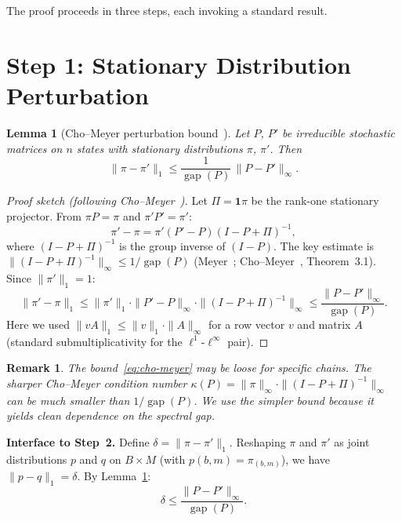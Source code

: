 \documentclass[11pt,a4paper]{article}
\newtheorem{lemma}[theorem]{Lemma}
\newtheorem{remark}[theorem]{Remark}
\DeclareMathOperator{\gap}{gap}
\begin{document}
The proof proceeds in three steps, each invoking a standard result.


\section{Step 1: Stationary Distribution Perturbation}\label{sec:step1}

\begin{lemma}[Cho--Meyer perturbation bound~\cite{ChoMeyer2001}]
\label{lem:cho-meyer}
Let $P$, $P'$ be irreducible stochastic matrices on $n$ states with
stationary distributions $\pi$, $\pi'$.  Then
\begin{equation}\label{eq:cho-meyer}
  \|\pi - \pi'\|_1 \le
  \frac{1}{\gap(P)}\,\|P - P'\|_\infty.
\end{equation}
\end{lemma}

\begin{proof}[Proof sketch (following Cho--Meyer~\cite{ChoMeyer2001})]
Let $\Pi = \mathbf{1}\pi$ be the rank-one stationary projector.
From $\pi P = \pi$ and $\pi' P' = \pi'$:
\[
  \pi' - \pi = \pi'(P' - P)(I - P + \Pi)^{-1},
\]
where $(I - P + \Pi)^{-1}$ is the group inverse of $(I - P)$.
The key estimate is $\|(I - P + \Pi)^{-1}\|_\infty \le 1/\gap(P)$
(Meyer~\cite{Meyer1975}; Cho--Meyer~\cite{ChoMeyer2001}, Theorem~3.1).
Since $\|\pi'\|_1 = 1$:
\[
  \|\pi' - \pi\|_1
  \le \|\pi'\|_1 \cdot \|P' - P\|_\infty \cdot \|(I - P + \Pi)^{-1}\|_\infty
  \le \frac{\|P - P'\|_\infty}{\gap(P)}.
\]
Here we used $\|v A\|_1 \le \|v\|_1 \cdot \|A\|_\infty$ for a row
vector $v$ and matrix $A$ (standard submultiplicativity for the
$\ell^1$-$\ell^\infty$ pair).
\end{proof}

\begin{remark}\label{rem:cho-meyer-tight}
The bound~\eqref{eq:cho-meyer} may be loose for specific chains.
The sharper Cho--Meyer condition number
$\kappa(P) = \|\pi\|_\infty \cdot \|(I - P + \Pi)^{-1}\|_\infty$
can be much smaller than $1/\gap(P)$.  We use the simpler bound because
it yields clean dependence on the spectral gap.
\end{remark}

\textbf{Interface to Step~2.}
Define $\delta = \|\pi - \pi'\|_1$.  Reshaping $\pi$ and $\pi'$ as
joint distributions $p$ and $q$ on $B \times M$ (with
$p(b,m) = \pi_{(b,m)}$), we have $\|p - q\|_1 = \delta$.
By Lemma~\ref{lem:cho-meyer}:
\begin{equation}\label{eq:delta-bound}
  \delta \le \frac{\|P - P'\|_\infty}{\gap(P)}.
\end{equation}
\end{document}
